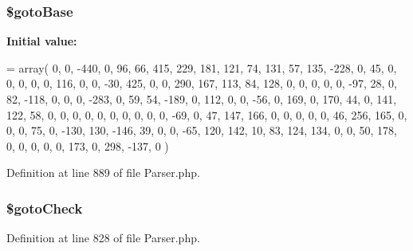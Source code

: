 \subsubsection[{\$goto\+Base}]{\setlength{\rightskip}{0pt plus 5cm}\$goto\+Base\hspace{0.3cm}{\ttfamily [protected]}}\label{class_php_parser_1_1_parser_a7029a078912eb36a27fd72f9e851741b}
{\bfseries Initial value\+:}
\begin{DoxyCode}
= array(
            0,    0, -440,    0,   96,   66,  415,  229,  181,  121,
           74,  131,   57,  135, -228,    0,   45,    0,    0,    0,
            0,    0,  116,    0,    0,  -30,  425,    0,    0,  290,
          167,  113,   84,  128,    0,    0,    0,    0,    0,  -97,
           28,    0,   82, -118,    0,    0,    0, -283,    0,   59,
           54, -189,    0,  112,    0,    0,  -56,    0,  169,    0,
          170,   44,    0,  141,  122,   58,    0,    0,    0,    0,
            0,    0,    0,    0,    0,    0,  -69,    0,   47,  147,
          166,    0,    0,    0,    0,    0,   46,  256,  165,    0,
            0,    0,   75,    0, -130,  130, -146,   39,    0,    0,
          -65,  120,  142,   10,   83,  124,  134,    0,    0,   50,
          178,    0,    0,    0,    0,    0,  173,    0,  298, -137,
            0
    )
\end{DoxyCode}


Definition at line 889 of file Parser.\+php.

\subsubsection[{\$goto\+Check}]{\setlength{\rightskip}{0pt plus 5cm}\$goto\+Check\hspace{0.3cm}{\ttfamily [protected]}}\label{class_php_parser_1_1_parser_a1e3d9ac0da016eb0b8925baee9636bd0}


Definition at line 828 of file Parser.\+php.

